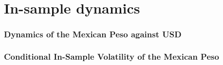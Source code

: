 \documentclass{beamer}
\begin{document}
\section{In-sample dynamics}
\begin{frame}[plain]
\frametitle{Dynamics of the Mexican Peso against USD}
\end{frame}


\begin{frame}[plain]
\frametitle{Conditional In-Sample Volatility of the Mexican Peso}
\end{frame}
\end{document}
